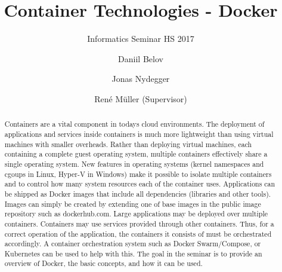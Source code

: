 \documentclass[sigconf]{acmart}
\begin{document}
\title{Container Technologies - Docker}
\subtitle{Informatics Seminar HS 2017}

\author{Daniil Belov}

\author{Jonas Nydegger}

\author{Ren\'e M\"uller (Supervisor)}

\begin{abstract}
	Containers are a vital component in todays cloud environments. 
	The deployment of applications and services inside containers is much more lightweight than using virtual machines with smaller overheads. Rather than deploying virtual machines, each containing a complete guest operating system, multiple containers effectively share a single operating system. 
	New features in operating systems (kernel namespaces and cgoups in Linux, Hyper-V in Windows) make it possible to isolate multiple containers and to control how many system resources each of the container uses.
	Applications can be shipped as Docker images that include all dependencies (libraries and other tools). Images can simply be created by extending one of base images in the public image repository such as dockerhub.com.
	Large applications may be deployed over multiple containers. Containers may use services provided through other containers. Thus, for a correct operation of the application, the containers it consists of must be orchestrated accordingly. A container orchestration system such as Docker Swarm/Compose, or Kubernetes can be used to help with this.
	The goal in the seminar is to provide an overview of Docker, the basic concepts, and how it can be used.
\end{abstract}
\end{document}
